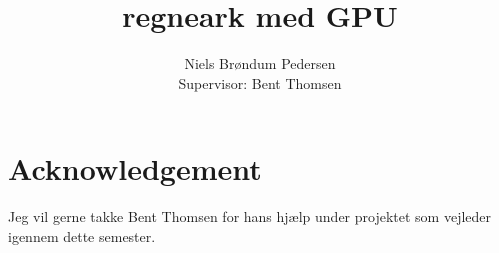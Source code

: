 \documentclass{llncs}
\begin{document}

\newpage

\title{regneark med GPU}

\author{Niels Br\o ndum Pedersen\\ Supervisor: Bent Thomsen}
\newpage











\section{Acknowledgement}\label{sec:Acknowledgement}
Jeg vil gerne takke Bent Thomsen for hans hjælp under projektet som vejleder igennem dette semester.


\end{document}
